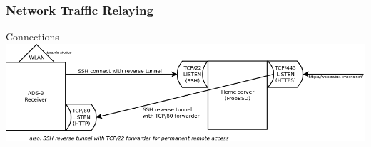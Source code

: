 \begin{frame}
\frametitle{Network Traffic Relaying}
\begin{block}{Connections}
\includegraphics{image/adsb-networking.png}


\end{block}
\end{frame}
